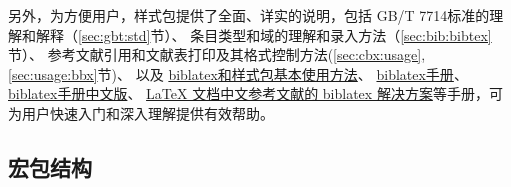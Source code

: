 \documentclass[11pt]{article} %
\begin{document}
\begin{enumerate}
另外，为方便用户，样式包提供了全面、详实的说明，包括
GB/T 7714标准的理解和解释（\ref{sec:gbt:std}节）、
条目类型和域的理解和录入方法（\ref{sec:bib:bibtex}节）、
参考文献引用和文献表打印及其格式控制方法(\ref{sec:cbx:usage},\ref{sec:usage:bbx}节)、
\hypertarget{lab:manual:hyper}{以及}
\href{https://github.com/hushidong/biblatex-gb7714-2015/wiki}{biblatex和样式包基本使用方法}、
\href{https://github.com/plk/biblatex}{biblatex手册}、
\href{https://github.com/hushidong/biblatex-zh-cn}{biblatex手册中文版}、
\href{https://github.com/hushidong/biblatex-solution-to-latex-bibliography}{LaTeX 文档中文参考文献的 biblatex 解决方案}等手册，可为用户快速入门和深入理解提供有效帮助。

\end{enumerate}


\subsection{宏包结构}
\end{document}
